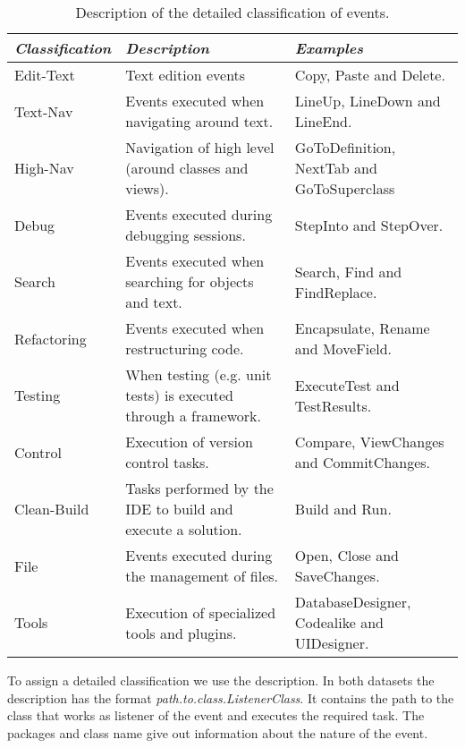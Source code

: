 \begin{table}[ht!]
	\small
	\caption{Description of the detailed classification of events. }
	\label{tbl:detailed_events}
	\centering
	\begin{tabular}{p{2cm}|p{4.5cm}|p{4.5cm}} 
		\hline 
		\emph{Classification} & \emph{Description} & \emph{Examples} \\  
		\hline 
		\hline 
		Edit-Text &  Text edition events & Copy, Paste and Delete. \\
		\hline
		Text-Nav & Events executed when navigating around text. & LineUp, LineDown and LineEnd.  \\
		\hline
		High-Nav & Navigation of high level  (around classes and views). & GoToDefinition, NextTab and GoToSuperclass \\
		\hline
		Debug & Events executed during debugging sessions. & StepInto and StepOver. \\
		\hline
		Search & Events executed when searching for objects and text. & Search, Find and FindReplace. \\
		\hline
		Refactoring & Events executed when restructuring code. & Encapsulate, Rename and MoveField. \\
		\hline
		Testing & When testing (e.g. unit tests) is executed through a framework. & ExecuteTest and TestResults. \\
		\hline
		Control & Execution of version control tasks. & Compare, ViewChanges and CommitChanges. \\
		\hline
		Clean-Build & Tasks performed by the IDE to build and execute a solution.  & Build and Run. \\
		\hline
		File & Events executed during the management of files. & Open, Close and SaveChanges. \\
		\hline
		Tools & Execution of specialized tools and plugins. & DatabaseDesigner, Codealike and UIDesigner.\\
		\hline
	\end{tabular}
	
\end{table}

To assign a detailed classification we use the description. In both datasets the description has the format \emph{path.to.class.ListenerClass}. It contains the path to the class that works as listener of the event and executes the required task. The packages and class name give out information about the nature of the event.



